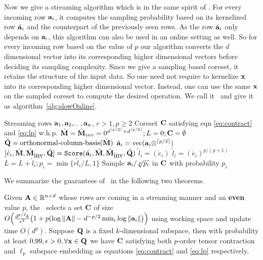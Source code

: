 Now we give a streaming algorithm which is in the same spirit of \online. For every incoming row $\mathbf{a}_{i}$, it computes the sampling probability based on its kernelized row $\acute{\mathbf{a}}_{i}$ and the counterpart of the previously seen rows. As the row $\acute{\mathbf{a}}_{i}$ only depends on $\mathbf{a}_{i}$, this algorithm can also be used in an online setting as well. 
So for every incoming row based on the value of $p$ our algorithm converts the $d$ dimensional vector into its corresponding higher dimensional vectors before deciding its sampling complexity. 
Since we give a sampling based coreset, it retains the structure of the input data. So one need not require to kernelize $\mathbf{x}$ into its corresponding higher dimensional vector. Instead, one can use the same $\mathbf{x}$ on the sampled coreset to compute the desired operation. We call it ~and give it as algorithm~\ref{alg:slowOnline}.
% 
\begin{algorithm}[htpb]
\caption{}{\label{alg:slowOnline}}
\begin{algorithmic}
\REQUIRE Streaming rows $\mathbf{a}_{1}, \mathbf{a}_{2}, _{\cdots}, \mathbf{a}_{n}$, $r>1, p\geq2$
\ENSURE Coreset $\mathbf{C}$ satisfying eqn \eqref{eq:contract} and \eqref{eq:lp} w.h.p.
\STATE $\acute{\mathbf{M}} = \acute{\mathbf{M}}_{inv} = 0^{d^{\lceil p/2 \rceil} \times d^{\lceil p/2 \rceil}}; L=0; \mathbf{C}= \emptyset$
\STATE $\acute{\mathbf{Q}} = \mbox{orthonormal-column-basis}(\acute{\mathbf{M}})$
\STATE $\acute{\mathbf{a}}_{i} = \mbox{vec}(\mathbf{a}_{i}\otimes^{\lceil p/2 \rceil})$
\STATE $[\acute{e}_{i}, \acute{\mathbf{M}}, \acute{\mathbf{M}}_{\mbox{inv}}, \acute{\mathbf{Q}}] = {\texttt{Score}}(\acute{\mathbf{a}}_{i},\acute{\mathbf{M}},\acute{\mathbf{M}}_{\mbox{inv}},\acute{\mathbf{Q}})$
    \STATE $\tilde{l}_{i} = (\acute{e}_{i})$
\ELSE
    \STATE $\tilde{l}_{i} = (\acute{e}_{i})^{p/(p+1)}$
\ENDIF
\STATE $L = L+\tilde{l}_{i}; p_{i} = \min\{r\tilde{l}_{i}/L,1\}$
\STATE Sample $\mathbf{a}_{i}/\sqrt[p]{p_{i}}$ in $\mathbf{C}$ with probability $p_{i}$
\ENDWHILE
\end{algorithmic}
\end{algorithm}
% 
We summarize the guarantees of ~in the following two theorems.
\begin{theorem}{\label{thm:slowOnline}}
 Given $\mathbf{A} \in \mathbb{R}^{n \times d}$ whose rows are coming in a streaming manner and an \textbf{even} value $p$, the ~selects a set $\mathbf{C}$ of size $O\Big(\frac{d^{p/2}k}{\epsilon^{2}}\big(1+p(\log \|\mathbf{A}\| - d^{-p/2}\min_{i}\log \|\mathbf{a}_{i}\|\big)\Big)$ using working space and update time $O(d^{p})$. Suppose $\mathbf{Q}$ is a fixed $k$-dimensional subspace, then with probability at least $0.99, \epsilon > 0, \forall \mathbf{x} \in \mathbf{Q}$ we have $\mathbf{C}$ satisfying both $p$-order tensor contraction and $\ell_{p}$ subspace embedding as equations \eqref{eq:contract} and \eqref{eq:lp} respectively.
\end{theorem}
